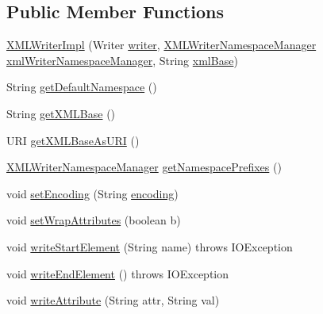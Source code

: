 \subsection*{Public Member Functions}
\begin{DoxyCompactItemize}
\item 
\hyperlink{classorg_1_1coode_1_1xml_1_1_x_m_l_writer_impl_a1160fed17fda547d8fd069187dfe73ae}{X\-M\-L\-Writer\-Impl} (Writer \hyperlink{classorg_1_1coode_1_1xml_1_1_x_m_l_writer_impl_a87d95a702c851f1b17169c04ffe5053d}{writer}, \hyperlink{classorg_1_1coode_1_1xml_1_1_x_m_l_writer_namespace_manager}{X\-M\-L\-Writer\-Namespace\-Manager} \hyperlink{classorg_1_1coode_1_1xml_1_1_x_m_l_writer_impl_aa1ea302da2200ab922b09a252fbb3070}{xml\-Writer\-Namespace\-Manager}, String \hyperlink{classorg_1_1coode_1_1xml_1_1_x_m_l_writer_impl_ac4284dec6be091aa7e17e9b7e65c9ce7}{xml\-Base})
\item 
String \hyperlink{classorg_1_1coode_1_1xml_1_1_x_m_l_writer_impl_ab597fdcb0ea620fecf26690783300c93}{get\-Default\-Namespace} ()
\item 
String \hyperlink{classorg_1_1coode_1_1xml_1_1_x_m_l_writer_impl_ae6e29f45e08f8398c46411fc0c3836a7}{get\-X\-M\-L\-Base} ()
\item 
U\-R\-I \hyperlink{classorg_1_1coode_1_1xml_1_1_x_m_l_writer_impl_a233bb0e17ac55cb076108ce157771bd5}{get\-X\-M\-L\-Base\-As\-U\-R\-I} ()
\item 
\hyperlink{classorg_1_1coode_1_1xml_1_1_x_m_l_writer_namespace_manager}{X\-M\-L\-Writer\-Namespace\-Manager} \hyperlink{classorg_1_1coode_1_1xml_1_1_x_m_l_writer_impl_a0b2c2435a5b4c28d03f5bb80b4c707c1}{get\-Namespace\-Prefixes} ()
\item 
void \hyperlink{classorg_1_1coode_1_1xml_1_1_x_m_l_writer_impl_abfc197871ece3ee9d8708194ea54add5}{set\-Encoding} (String \hyperlink{classorg_1_1coode_1_1xml_1_1_x_m_l_writer_impl_a730e320ad09cc4014ddbcf1b3cd3c594}{encoding})
\item 
void \hyperlink{classorg_1_1coode_1_1xml_1_1_x_m_l_writer_impl_a714c4e2841e393c02865c572327694d8}{set\-Wrap\-Attributes} (boolean b)
\item 
void \hyperlink{classorg_1_1coode_1_1xml_1_1_x_m_l_writer_impl_a66d246b725aa39a3d446b0df8c2838a8}{write\-Start\-Element} (String name)  throws I\-O\-Exception 
\item 
void \hyperlink{classorg_1_1coode_1_1xml_1_1_x_m_l_writer_impl_a9ff24913bb35e723d5c2a19a9ded27eb}{write\-End\-Element} ()  throws I\-O\-Exception 
\item 
void \hyperlink{classorg_1_1coode_1_1xml_1_1_x_m_l_writer_impl_a94624c9778ae996db1541d1f87f740ce}{write\-Attribute} (String attr, String val)

\end{DoxyCompactItemize}
